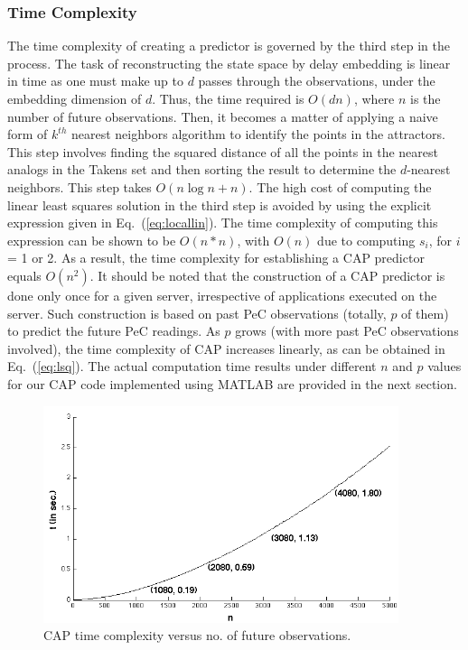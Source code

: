 \documentclass[prodmode,acmtaco,pdftex]{acmsmall}
\newcommand{\equationname}{Eq.}
\begin{document}
\subsubsection{Time Complexity}  
The time complexity of creating a predictor is governed by the third
step in the process.  The task of reconstructing the state space by
delay embedding is linear in time as one must make up to $d$ passes
through the observations, under the embedding dimension of $d$.
Thus, the time required is $O(dn)$, where $n$ is the number of future
observations.  Then, it becomes a matter of applying a naive form of
$k^{th}$ nearest neighbors algorithm to identify the points in the
attractors.  This step involves finding the squared distance of all the
points in the nearest analogs in the Takens set and then sorting the
result to determine the $d$-nearest neighbors.  This step takes
$O(n\log{n}+n)$.  The high cost of computing the linear least squares
solution in the third step is avoided by using the explicit expression
given in \equationname~(\ref{eq:locallin}).  The time complexity of computing this
expression can be shown to be $O(n*n)$, with $O(n)$ due to computing
$s_{i}$, for $i$ = 1 or 2.  As a result, the time complexity for
establishing a CAP predictor equals $O(n^{2})$.  It should be noted that
the construction of a CAP predictor is done only once for a given
server, irrespective of applications executed on the server.  Such
construction is based on past PeC observations (totally, $p$ of them)
to predict the future PeC readings.  As $p$ grows (with more past PeC
observations involved), the time complexity of CAP increases linearly,
as can be obtained in \equationname~(\ref{eq:lsq}).  The actual computation time
results under different $n$ and $p$ values for our CAP code implemented
using MATLAB are provided in the next section.
\begin{figure}[tp]
    \centering
    \includegraphics[width=0.9\linewidth,height=2.5in]{complexity}
    \caption{CAP time complexity versus no. of future observations.}
    \label{fig:complexity}
\end{figure}
\end{document}

